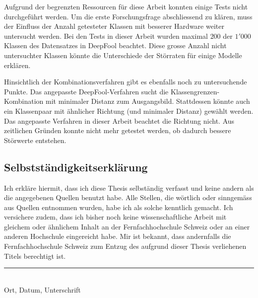 \documentclass{FFHS_Thesis_Additions/ffhsthesis}
\begin{document}
Aufgrund der begrenzten Ressourcen für diese Arbeit konnten einige Tests nicht durchgeführt werden. Um die erste Forschungsfrage abschliessend zu klären, muss der Einfluss der Anzahl getesteter Klassen mit besserer Hardware weiter untersucht werden. Bei den Tests in dieser Arbeit wurden maximal $200$ der $1'000$ Klassen des Datensatzes in DeepFool beachtet. Diese grosse Anzahl nicht untersuchter Klassen könnte die Unterschiede der Störraten für einige Modelle erklären. 

Hinsichtlich der Kombinationsverfahren gibt es ebenfalls noch zu untersuchende Punkte. Das angepasste DeepFool-Verfahren sucht die Klassengrenzen-Kombination mit minimaler Distanz zum Ausgangsbild. Stattdessen könnte auch ein Klassenpaar mit ähnlicher Richtung (und minimaler Distanz) gewählt werden. Das angepasste Verfahren in dieser Arbeit beachtet die Richtung nicht. Aus zeitlichen Gründen konnte nicht mehr getestet werden, ob dadurch bessere Störwerte entstehen.


\listoffigures

\listoftables





\newpage

\begin{appendix}


\chapter*{Selbstständigkeitserklärung}
Ich erkläre hiermit, dass ich diese Thesis selbständig verfasst 
und keine andern als die angegebenen Quellen benutzt habe. 
Alle Stellen, die wörtlich oder sinngemäss aus Quellen entnommen wurden, 
habe ich als solche kenntlich gemacht. Ich versichere zudem, dass ich bisher 
noch keine wissenschaftliche Arbeit mit gleichem oder ähnlichem Inhalt an der 
Fernfachhochschule Schweiz oder an einer anderen Hochschule eingereicht habe. 
Mir ist bekannt, dass andernfalls die Fernfachhochschule Schweiz zum Entzug 
des aufgrund dieser Thesis verliehenen Titels berechtigt ist.

\vspace{4cm}
\noindent
\hrule \ \\[-0.5ex]
Ort, Datum, Unterschrift
\end{appendix}
\end{document}
